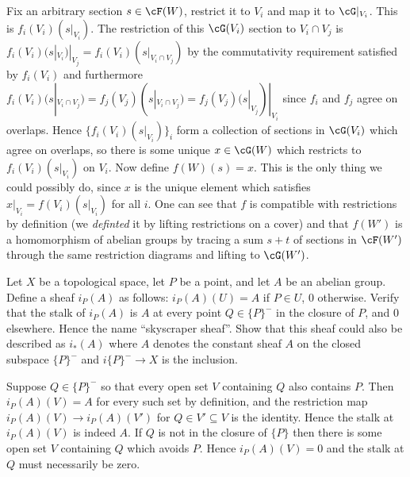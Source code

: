 \begin{homework}[e]
\begin{prf}
		Fix an arbitrary section $s \in \cF(W)$, restrict it to $V_i$ and map it to $\cG|_{V_i}$. This is $f_i(V_i)(s|_{V_i})$. The restriction of this $\cG(V_i)$ section to $V_i\cap V_j$ is $f_i(V_i)(s|_{V_i})|_{V_j} = f_i(V_i)(s|_{V_i\cap V_j})$ by the commutativity requirement satisfied by $f_i(V_i)$ and furthermore $f_i(V_i)(s|_{V_i\cap V_j}) = f_j(V_j)(s|_{V_i\cap V_j}) = f_j(V_j)(s|_{V_j})|_{V_i}$ since $f_i$ and $f_j$ agree on overlaps. Hence $\{f_i(V_i)(s|_{V_i})\}_i$ form a collection of sections in $\cG(V_i)$ which agree on overlaps, so there is some unique $x \in \cG(W)$ which restricts to $f_i(V_i)(s|_{V_i})$ on $V_i$. Now define $f(W)(s) = x$. This is the only thing we could possibly do, since $x$ is the unique element which satisfies $x|_{V_i} = f(V_i)(s|_{V_i})$ for all $i$. One can see that $f$ is compatible with restrictions by definition (we \emph{definted} it by lifting restrictions on a cover) and that $f(W')$ is a homomorphism of abelian groups by tracing a sum $s + t$ of sections in $\cF(W')$ through the same restriction diagrams and lifting to $\cG(W')$.
	\end{prf}
	 Let $X$ be a topological space, let $P$ be a point, and let $A$ be an abelian group. Define a sheaf $i_P(A)$ as follows: $i_P(A)(U) = A$ if $P\in U$, $0$ otherwise. Verify that the stalk of $i_P(A)$ is $A$ at every point $Q\in \{P\}^-$ in the closure of $P$, and $0$ elsewhere. Hence the name ``skyscraper sheaf''. Show that this sheaf could also be described as $i_*(A)$ where $A$ denotes the constant sheaf $A$ on the closed subspace $\{P\}^-$ and $i\{P\}^-\to X$ is the inclusion.
	\begin{prf}
		Suppose $Q\in \{P\}^-$ so that every open set $V$ containing $Q$ also contains $P$. Then $i_P(A)(V) = A$ for every such set by definition, and the restriction map $i_P(A)(V) \to i_P(A)(V')$ for $Q \in V' \subseteq V$ is the identity. Hence the stalk at $i_P(A)(V)$ is indeed $A$. If $Q$ is not in the closure of $\{P\}$ then there is some open set $V$ containing $Q$ which avoids $P$. Hence $i_P(A)(V) = 0$ and the stalk at $Q$ must necessarily be zero.


\end{prf}
\end{homework}
